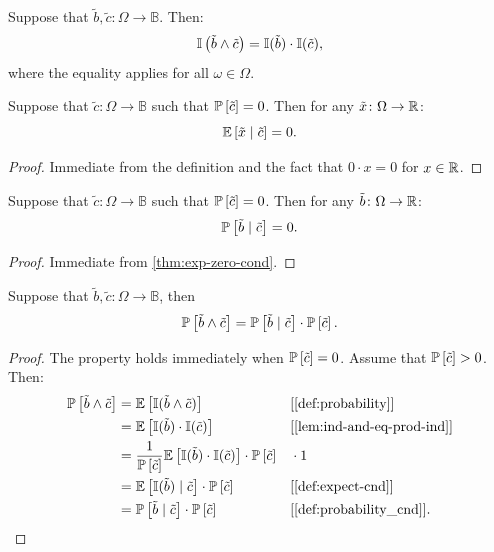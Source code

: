 \begin{lemma} \label{lem:ind-and-eq-prod-ind}
Suppose that $\tilde{b}, \tilde{c} \colon \Omega \to \mathbb{B}$. Then:
\[
\mathbb{I} \left( \tilde{b} \wedge \tilde{c} \right) = \mathbb{I} ( \tilde{b} ) \cdot  \mathbb{I} ( \tilde{c} ),  
\]
where the equality applies for all $\omega \in \Omega$.
\end{lemma}

\begin{theorem} \label{thm:exp-zero-cond}
Suppose that $\tilde{c} \colon \Omega \to \mathbb{B}$ such that $\mathbb{P}\left[ \tilde{c} \right] = 0$. Then for any $\tilde{x} \colon \Omega \to \mathbb{R}$:
\[
\mathbb{E} \left[ \tilde{x} \mid \tilde{c} \right] = 0.
\]
\end{theorem}
\begin{proof}
Immediate from the definition and the fact that $0 \cdot  x = 0$ for $x\in \mathbb{R}$.
\end{proof}

\begin{theorem} \label{thm:prob-zero-cond}
Suppose that $\tilde{c} \colon \Omega \to \mathbb{B}$ such that $\mathbb{P}\left[ \tilde{c} \right] = 0$. Then for any $\tilde{b} \colon \Omega \to \mathbb{R}$:
\[
\mathbb{P}\left[ \tilde{b} \mid \tilde{c} \right] = 0.
\]
\end{theorem}
\begin{proof}
Immediate from \cref{thm:exp-zero-cond}.
\end{proof}

\begin{theorem} \label{thm:prob-eq-prob-cond-prob}
Suppose that $\tilde{b}, \tilde{c} \colon \Omega \to \mathbb{B}$, then
\[
\mathbb{P} \left[ \tilde{b} \wedge \tilde{c} \right] 
=
\mathbb{P} \left[ \tilde{b} \mid \tilde{c} \right] \cdot \mathbb{P} \left[ \tilde{c} \right].
\]
\end{theorem}
\begin{proof} The property holds immediately when $\mathbb{P} \left[ \tilde{c} \right] = 0$. Assume that $\mathbb{P} \left[ \tilde{c} \right] > 0$. Then:
  \begin{align*}
    \PP \left[ \tilde{b} \wedge \tilde{c} \right]
    &= \E \left[ \I(\tilde{b} \wedge \tilde{c}) \right] && \why{\cref{def:probability}} \\
    &= \E \left[ \I(\tilde{b}) \cdot \I(\tilde{c}) \right] && \why{\cref{lem:ind-and-eq-prod-ind}}\\
    &= \frac{1}{\PP \left[ \tilde{c} \right]}\E \left[ \I(\tilde{b}) \cdot \I(\tilde{c}) \right] \cdot \PP \left[ \tilde{c} \right] && \cdot 1 \\
    &= \E \left[ \I(\tilde{b}) \mid \tilde{c} \right] \cdot \PP \left[ \tilde{c} \right]
    && \why{\cref{def:expect-cnd}} \\
    &= \PP \left[ \tilde{b} \mid \tilde{c} \right] \cdot \PP \left[ \tilde{c} \right] && \why{\cref{def:probability_cnd}}.
  \end{align*}
\end{proof}

